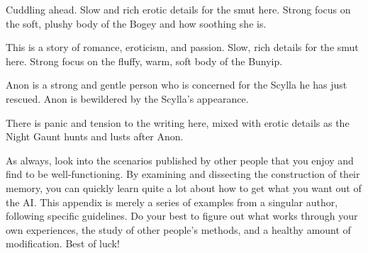 \documentclass[Coomer-main.tex]{subfiles}
\begin{document}
\begin{/an}
Cuddling ahead. Slow and rich erotic details for the smut here. Strong focus on the soft, plushy body of the Bogey and how soothing she is.
\end{/an}

\begin{/an}
This is a story of romance, eroticism, and passion. Slow, rich details for the smut here. Strong focus on the fluffy, warm, soft body of the Bunyip.
\end{/an}

\begin{/an}
Anon is a strong and gentle person who is concerned for the Scylla he has just rescued. Anon is bewildered by the Scylla's appearance.
\end{/an}

\begin{/an}
There is panic and tension to the writing here, mixed with erotic details as the Night Gaunt hunts and lusts after Anon.
\end{/an}

As always, look into the scenarios published by other people that you enjoy and find to be well-functioning. By examining and dissecting the construction of their memory, you can quickly learn quite a lot about how to get what you want out of the AI. This appendix is merely a series of examples from a singular author, following specific guidelines. Do your best to figure out what works through your own experiences, the study of other people’s methods, and a healthy amount of modification. Best of luck!
\end{document}

